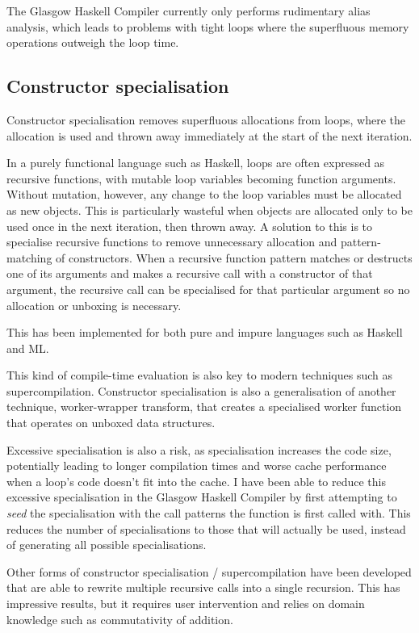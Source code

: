 The Glasgow Haskell Compiler currently only performs rudimentary alias analysis, which leads to problems with tight loops
where the superfluous memory operations outweigh the loop time.

\subsection{Constructor specialisation}

Constructor specialisation removes superfluous allocations from loops\cite{bechet1994limix},
where the allocation is used and thrown away immediately at the start of the next iteration.

In a purely functional language such as Haskell, loops are often expressed as recursive functions, with mutable loop variables becoming function arguments. 
Without mutation, however, any change to the loop variables must be allocated as new objects\cite{peyton2007call}.
This is particularly wasteful when objects are allocated only to be used once in the next iteration, then thrown away.
A solution to this is to specialise recursive functions to remove unnecessary allocation and pattern-matching of constructors.
When a recursive function pattern matches or destructs one of its arguments and makes a recursive call with a constructor of that argument,
the recursive call can be specialised for that particular argument so no allocation or unboxing is necessary.

This has been implemented for both pure and impure languages such as Haskell and ML\cite{thiemann1993avoiding, mogensen1993constructor}.

This kind of compile-time evaluation is also key to modern techniques such as supercompilation\cite{bolingbroke2011supercomp}.
Constructor specialisation is also a generalisation of another technique, worker-wrapper transform\cite{gill2009worker},
that creates a specialised worker function that operates on unboxed data structures.

Excessive specialisation is also a risk, as specialisation increases the code size, potentially leading to longer compilation times and worse cache performance when a loop's code doesn't fit into the cache.
I have been able to reduce this excessive specialisation in the Glasgow Haskell Compiler by first attempting to \emph{seed} the specialisation with the call patterns the function is first called with.
This reduces the number of specialisations to those that will actually be used, instead of generating all possible specialisations.

Other forms of constructor specialisation / supercompilation have been developed that are able to rewrite multiple recursive calls into a single recursion\cite{burstall1977transformation}.
This has impressive results, but it requires user intervention and relies on domain knowledge such as commutativity of addition.



